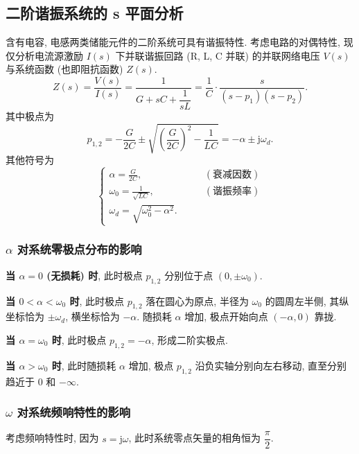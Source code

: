\subsection{二阶谐振系统的 s 平面分析} \label{4 二阶谐振系统的 s 平面分析}
含有电容, 电感两类储能元件的二阶系统可具有谐振特性. 考虑电路的对偶特性, 现仅分析电流源激励 $I(s)$ 下并联谐振回路 (R, L, C 并联) 的并联网络电压 $V(s)$ 与系统函数 (也即阻抗函数) $Z(s)$.
\begin{equation}
    Z(s)=\frac{V(s)}{I(s)}=\frac{1}{G+sC+\dfrac{1}{sL}}=\frac{1}{C}\cdot\frac{s}{(s-p_1)(s-p_2)}.
\end{equation}
其中极点为
\begin{equation}
    p_{1,2}=-\frac{G}{2C}\pm\sqrt{\left(\frac{G}{2C}\right)^2-\frac{1}{LC}}=-\alpha\pm\mathrm{j}\omega_d.
\end{equation}
其他符号为
\begin{equation}
    \begin{cases}
        \alpha=\frac{G}{2C},          & \qquad (\textrm{衰减因数}) \\
        \omega_0=\frac{1}{\sqrt{LC}}, & \qquad (\textrm{谐振频率}) \\
        \omega_d=\sqrt{\omega_0^2-\alpha^2}.
    \end{cases}
\end{equation}

\subsubsection{\texorpdfstring{$\alpha$}{alpha} 对系统零极点分布的影响}
\textbf{当 $\alpha=0$ (无损耗) 时}, 此时极点 $p_{1,2}$ 分别位于点 $(0,\pm\omega_0)$.

\textbf{当 $0<\alpha<\omega_0$ 时}, 此时极点 $p_{1,2}$ 落在圆心为原点, 半径为 $\omega_0$ 的圆周左半侧, 其纵坐标恰为 $\pm\omega_d$, 横坐标恰为 $-\alpha$. 随损耗 $\alpha$ 增加, 极点开始向点 $(-\alpha,0)$ 靠拢.

\textbf{当 $\alpha=\omega_0$ 时}, 此时极点 $p_{1,2}=-\alpha$, 形成二阶实极点.

\textbf{当 $\alpha>\omega_0$ 时}, 此时随损耗 $\alpha$ 增加, 极点 $p_{1,2}$ 沿负实轴分别向左右移动, 直至分别趋近于 $0$ 和 $-\infty$.

\subsubsection{\texorpdfstring{$\omega$}{omega} 对系统频响特性的影响}
考虑频响特性时, 因为 $s=\mathrm{j}\omega$, 此时系统零点矢量的相角恒为 $\dfrac{\pi}{2}$.


